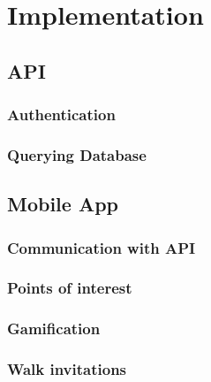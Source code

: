\chapter{Implementation}


\section{API}

\subsection{Authentication}

\subsection{Querying Database}


\section{Mobile App}

\subsection{Communication with API}

\subsection{Points of interest}

\subsection{Gamification}

\subsection{Walk invitations}